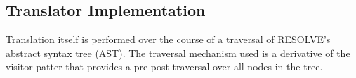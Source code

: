 

 





\subsection{Translator Implementation}

Translation itself is performed over the course of a traversal of RESOLVE's abstract syntax tree (AST). The traversal mechanism used is a derivative of the visitor patter that provides a pre post traversal over all nodes in the tree. 


